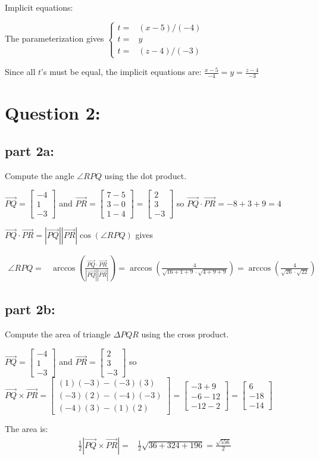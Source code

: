 \documentclass{article}
\newcommand{\abs}[1]{\left|#1\right|}
\newcommand{\colvec}[3]{\begin{bmatrix} #1 \\ #2 \\ #3 \end{bmatrix}}
\newcommand{\pvec}[1]{\overrightarrow{#1}}
\newcommand{\dr}[1]{\textcolor{dark_red}{#1}}
\begin{document}
\dr{Implicit equations: }

\dr{The parameterization gives \(\left\{\begin{array}{rl} t = & (x - 5)/(-4) \\ t = & y \\ t = & (z - 4)/(-3) \end{array}\right.\)} 

\dr{Since all \(t\)'s must be equal, the implicit equations are: \(\frac{x - 5}{-4} = y = \frac{z - 4}{-3}\)}



\section*{Question 2:}

\subsection*{part 2a:}

Compute the angle \(\angle RPQ\) using the dot product. 

\dr{\(\pvec{PQ} = \colvec{-4}{1}{-3}\) and \(\pvec{PR} = \colvec{7 - 5}{3 - 0}{1 - 4} = \colvec{2}{3}{-3}\) so 
\(\pvec{PQ} \cdot \pvec{PR} = -8 + 3 + 9 = 4\)}

\dr{\(\pvec{PQ} \cdot \pvec{PR} = \abs{\pvec{PQ}} \abs{\pvec{PR}} \cos(\angle RPQ)\) gives}

\dr{\begin{align*}
\angle RPQ = & \arccos\left(\frac{\pvec{PQ} \cdot \pvec{PR}}{\abs{\pvec{PQ}} \abs{\pvec{PR}}}\right) 
= \arccos\left(\frac{4}{\sqrt{16 + 1 + 9} \cdot \sqrt{4 + 9 + 9}}\right) 
= \arccos\left(\frac{4}{\sqrt{26} \cdot \sqrt{22}}\right) 
\end{align*}}


\subsection*{part 2b:}

Compute the area of triangle \(\Delta PQR\) using the cross product. 

\dr{\(\pvec{PQ} = \colvec{-4}{1}{-3}\) and \(\pvec{PR} = \colvec{2}{3}{-3}\) so 
\(\pvec{PQ} \times \pvec{PR} = \colvec{(1)(-3) - (-3)(3)}{(-3)(2) - (-4)(-3)}{(-4)(3) - (1)(2)} = \colvec{-3 + 9}{-6 - 12}{-12 - 2} = \colvec{6}{-18}{-14}\)}

\dr{The area is:
\begin{align*}
\frac{1}{2}\abs{\pvec{PQ} \times \pvec{PR}} = & \frac{1}{2}\sqrt{36 + 324 + 196} 
= \frac{\sqrt{556}}{2}
\end{align*}}
\end{document}
